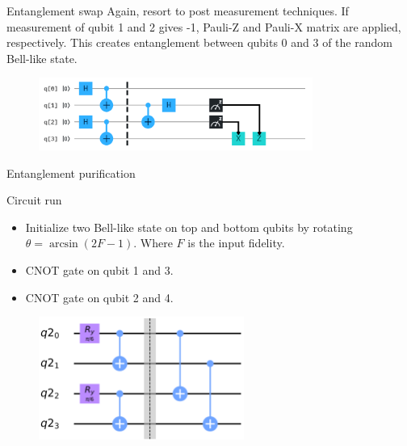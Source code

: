 \begin{frame}{Entanglement swap}
Again, resort to post measurement techniques. If measurement of qubit 1 and 2
gives -1, Pauli-Z and Pauli-X matrix are applied, respectively. This creates
entanglement between qubits 0 and 3 of the random Bell-like state.
\vspace{0.5cm}
  \begin{figure}[h] \centering
  \includegraphics[width=0.8\textwidth]{images/swap_general.png}
  \label{fig:swap_gen}
\end{figure}
	
\end{frame}

\begin{frame}{Entanglement purification}
	
\begin{block}{Circuit run}
  \begin{itemize}
    \item Initialize two Bell-like state on top and bottom qubits by rotating
$\theta = \arcsin{\left(2F-1\right)}$. Where $F$ is the input fidelity.
    \item CNOT gate on qubit 1 and 3.
    \item CNOT gate on qubit 2 and 4.
  \end{itemize}
\end{block}
	
\begin{figure}[h] \centering
  \includegraphics[width=0.6\textwidth]{images/purification_circuit.png}
  \label{fig:puri_circ}
\end{figure}
	
\end{frame}

